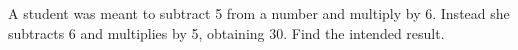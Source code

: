 A student was meant to subtract 5 from a number and multiply by 6. Instead she subtracts 6 and multiplies by 5, obtaining 30. Find the intended result.
